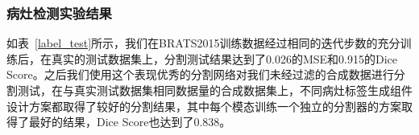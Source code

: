 \documentclass[letterpaper]{article} %
\begin{document}
\subsubsection{病灶检测实验结果}
\begin{table}[t]
	\caption{病灶检测实验结果.}\smallskip
	\centering
	\label{label_test}	
\end{table}

如表~\ref{label_test}所示，我们在BRATS2015训练数据经过相同的迭代步数的充分训练后，在真实的测试数据集上，分割测试结果达到了0.026的MSE和0.915的Dice Score。之后我们使用这个表现优秀的分割网络对我们未经过滤的合成数据进行分割测试，在与真实测试数据集相同数据量的合成数据集上，不同病灶标签生成组件设计方案都取得了较好的分割结果，其中每个模态训练一个独立的分割器的方案取得了最好的结果，Dice Score也达到了0.838。
\end{document}
